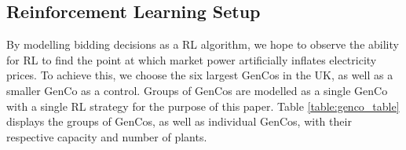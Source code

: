 \documentclass[conference]{IEEEtran}
\begin{document}
\subsection{Reinforcement Learning Setup}

By modelling bidding decisions as a RL algorithm, we hope to observe the ability for RL to find the point at which market power artificially inflates electricity prices. To achieve this, we choose the six largest GenCos in the UK, as well as a smaller GenCo as a control. Groups of GenCos are modelled as a single GenCo with a single RL strategy for the purpose of this paper. Table \ref{table:genco_table} displays the groups of GenCos, as well as individual GenCos, with their respective capacity and number of plants.
\end{document}
